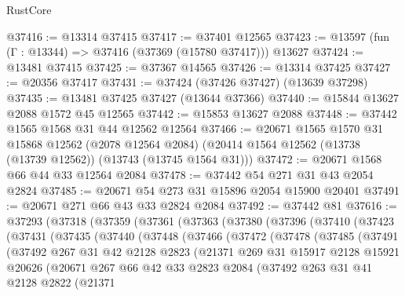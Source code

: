 \begin{lexlean}{RustCore}
\begin{coremodule}
@37416 := @13314 @37415
@37417 := @37401 @12565
@37423 := @13597 (fun (Γ : @13344) => @37416 (@37369 (@15780 @37417))) @13627
@37424 := @13481 @37415
@37425 := @37367 @14565
@37426 := @13314 @37425
@37427 := @20356 @37417
@37431 := @37424 (@37426 @37427) (@13639 @37298)
@37435 := @13481 @37425 @37427 (@13644 @37366)
@37440 := @15844 @13627 @2088 @1572 @45 @12565
@37442 := @15853 @13627 @2088
@37448 := @37442 @1565 @1568 @31 @44 @12562 @12564
@37466 := @20671
    @1565
    @1570
    @31
    @15868
    @12562
    (@2078 @12564 @2084)
    (@20414 @1564 @12562 (@13738 (@13739 @12562)) (@13743 (@13745 @1564 @31)))
@37472 := @20671 @1568 @66 @44 @33 @12564 @2084
@37478 := @37442 @54 @271 @31 @43 @2054 @2824
@37485 := @20671 @54 @273 @31 @15896 @2054 @15900 @20401
@37491 := @20671 @271 @66 @43 @33 @2824 @2084
@37492 := @37442 @81
@37616 := @37293
    (@37318
      (@37359
        (@37361
          (@37363
            (@37380
              (@37396
                (@37410
                  (@37423
                    (@37431
                      (@37435
                        (@37440
                          (@37448
                            (@37466
                              (@37472
                                (@37478
                                  (@37485
                                    (@37491
                                      (@37492
                                        @267
                                        @31
                                        @42
                                        @2128
                                        @2823
                                        (@21371
                                          @269
                                          @31
                                          @15917
                                          @2128
                                          @15921
                                          @20626
                                          (@20671
                                            @267
                                            @66
                                            @42
                                            @33
                                            @2823
                                            @2084
                                            (@37492
                                              @263
                                              @31
                                              @41
                                              @2128
                                              @2822
                                              (@21371

\end{coremodule}
\end{lexlean}
